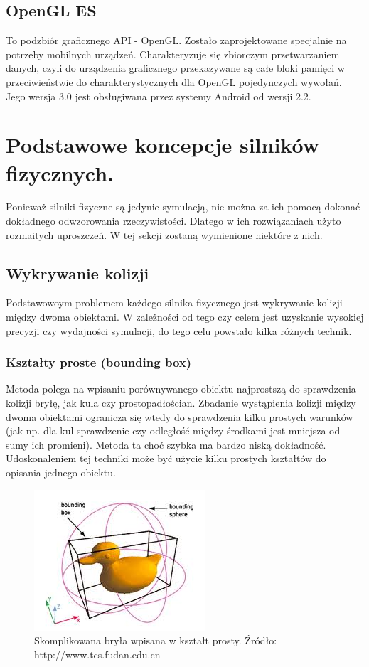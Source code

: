 \subsection{OpenGL ES}
To podzbiór graficznego API - OpenGL. Zostało zaprojektowane specjalnie na
potrzeby mobilnych urządzeń. Charakteryzuje się zbiorczym przetwarzaniem
danych, czyli do urządzenia graficznego przekazywane są całe bloki pamięci w
przeciwieństwie do charakterystycznych dla OpenGL pojedynczych wywołań. Jego
wersja 3.0 jest obsługiwana przez systemy Android od wersji 2.2.

\newpage
\section{Podstawowe koncepcje silników fizycznych.}
Ponieważ silniki fizyczne są jedynie symulacją, nie można za ich pomocą dokonać
dokładnego odwzorowania rzeczywistości. Dlatego w ich rozwiązaniach użyto
rozmaitych uproszczeń. W tej sekcji zostaną wymienione niektóre z nich.

\subsection{Wykrywanie kolizji}
Podstawowoym problemem każdego silnika fizycznego jest wykrywanie kolizji między
dwoma obiektami. W zależności od tego czy celem jest uzyskanie wysokiej precyzji
czy wydajności symulacji, do tego celu powstało kilka różnych technik.

\subsubsection{Kształty proste (bounding box)}
Metoda polega na wpisaniu porównywanego obiektu najprostszą do sprawdzenia
kolizji bryłę, jak kula czy prostopadłościan. Zbadanie wystąpienia kolizji
między dwoma obiektami ogranicza się wtedy do sprawdzenia kilku prostych
warunków (jak np. dla kul sprawdzenie czy odległość między środkami jest
mniejsza od sumy ich promieni). Metoda ta choć szybka ma bardzo niską
dokładność. Udoskonaleniem tej techniki może być użycie kilku prostych kształtów
do opisania jednego obiektu.

\begin{figure}
\centering
\includegraphics[scale=0.5]{./img/boundingBox.jpg}
\caption{Skomplikowana bryła wpisana w kształt prosty. Źródło:
http://www.tcs.fudan.edu.cn}
\label{fig:bbox}
\end{figure}

